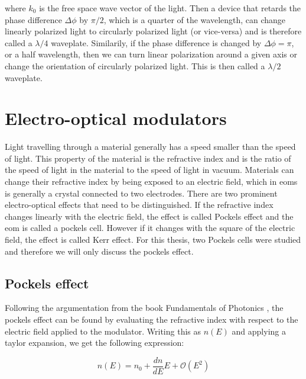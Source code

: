 where $k_0$ is the free space wave vector of the light. Then a device that retards the phase difference $\Delta \phi$ by $\pi/2$, which is a quarter of the wavelength, can change linearly polarized light to circularly polarized light (or vice-versa) and is therefore called a $\lambda / 4$ waveplate. Similarily, if the phase difference is changed by $\Delta \phi = \pi$, or a half wavelength, then we can turn linear polarization around a given axis or change the orientation of circularly polarized light. This is then called a $\lambda / 2$ waveplate.

\section{Electro-optical modulators}
\label{sec:eom}

Light travelling through a material generally has a speed smaller than the speed of light. This property of the material is the refractive index and is the ratio of the speed of light in the material to the speed of light in vacuum. Materials can change their refractive index by being exposed to an electric field, which in \acp{eom} is generally a crystal connected to two electrodes. There are two prominent electro-optical effects that need to be distinguished. If the refractive index changes linearly with the electric field, the effect is called Pockels effect and the \ac{eom} is called a pockels cell. However if it changes with the square of the electric field, the effect is called Kerr effect. For this thesis, two Pockels cells were studied and therefore we will only discuss the pockels effect.


\subsection{Pockels effect}
\label{sec:pockels_effect}

Following the argumentation from the book Fundamentals of Photonics \cite{Saleh1991}, the pockels effect can be found by evaluating the refractive index with respect to the electric field applied to the modulator. Writing this as $n(E)$ and applying a taylor expansion, we get the following expression:

\begin{equation}
	n(E) = n_0 + \frac{dn}{dE} E + \mathcal{O}(E^2)
\end{equation}

